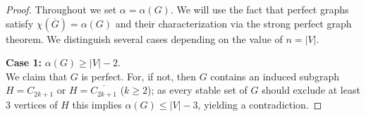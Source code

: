 \documentclass[11pt]{article}
\newcommand{\ignore}[1]{}
\numberwithin{equation}{section}
\begin{document}
\begin{proof}
Throughout we set $\alpha=\alpha(G)$. We will use the fact that perfect graphs satisfy $\chi(\overline G)=\alpha(G)$ and their characterization via the strong perfect graph theorem. We distinguish several cases depending on the value of $n=|V|$. 

\noindent \textbf{ Case 1:} $\alpha(G)\geq |V|-2$.\\
We claim that $G$ is perfect. For, if not, then $G$ contains  an induced subgraph  $H=C_{2k+1}$ or $H=\overline{C_{2k+1}}$ ($k\ge 2$); as  every stable set of $G$ should exclude at least 3 vertices of $H$ this implies $\alpha(G)\leq |V|-3$, yielding a contradiction.

 \ignore{{\bf Case 1:} 
$\alpha(G)=|V|$: Then $G$ consists of isolated nodes and the result is clear. 


\smallskip\noindent
{\bf Case 2:}   $\alpha(G)=|V|-1$: Let $S$ be an $\alpha$-stable set and set $V\setminus S=\{x\}$. %
Then $x$ is adjacent to some node $y\in S$ and thus $V$ is covered by the  clique $\{x,y\}$ and the $\alpha-1$ singletons $\{v\}$ for $v\in S\setminus \{y\}$.


\smallskip\noindent
{\bf Case 3:}
$\alpha(G)=|V|-2$: Let $S$ be an $\alpha$-stable set and set $V\setminus{S}=\{x,y\}$. Then $x$ and $y$ are adjacent to some node in $S$.
We have two cases:\\
$\bullet$ There exist $u\ne w\in S$ such that $\{x,u\}\in E$ and  $\{y,w\}\in E$: Then $G$ is covered by the two edges $\{x,u\}$, $\{y,w\}$ and the $\alpha -2$ singletons $\{v\}$ for $v\in S\setminus \{w,z\}$.\\
$\bullet$  The two nodes $x,y$ are adjacent to a single node $u$  in $S$: $N_S(x)=N_S(y)=\{u\}$. As the set $V\setminus \{u\}\cup\{x,y\}$ is not stable since its size is $\alpha+1$, $x,y$ must be adjacent  and thus $\{x,y,z\}$ is a clique.  Hence $G$ is covered by  the clique $\{x,y,z\}$ and the $\alpha -1$ singletons $\{v\}$ for $v\in S\setminus \{z\}$.
}


\end{proof}
\end{document}
